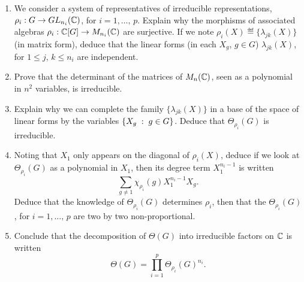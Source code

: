 \begin{exo}
\begin{enumerate}
\item We consider a system of representatives of irreducible representations, $ \rho_i: G \rightarrow GL_{n_i} (\mathbb{C}) $, for $ i = 1, \ldots, \, p $. Explain why the morphisms of associated algebras $ \rho_i: \mathbb{C} [G] \rightarrow M_{n_i} (\mathbb{C}) $ are surjective. If we note $ \rho_i (X) \eqdef \{\lambda_{jk} (X)\} $ (in matrix form), deduce that the linear forms (in each $ X_g $, $ g \in G $) $ \lambda_{jk} (X) $, for $ 1 \leq j, \, k \leq n_i $ are independent.
\item Prove that the determinant of the matrices of $ M_n (\mathbb{C}) $, seen as a polynomial in $ n^2 $ variables, is irreducible.
\item Explain why we can complete the family $ \{\lambda_{jk} (X)\} $ in a base of the space of linear forms by the variables $ \left\{ X_g \;:\; g \in G \right\} $. Deduce that $ \Theta_{\rho_i} (G) $ is irreducible.
\item Noting that $ X_1 $ only appears on the diagonal of $ \rho_i (X) $, deduce if we look at $ \Theta_{\rho_i} (G) $ as a polynomial in $ X_1 $, then its degree term $ X_1^{n_i-1} $ is written
\begin{equation*}
\sum_{g \neq 1}{\chi_{\rho_i} (g) X_1^{n_i-1} X_g}.
\end{equation*}
Deduce that the knowledge of $ \Theta_{\rho_i} (G) $ determines $ \rho_i $, then that the $ \Theta_{\rho_i} (G) $, for $ i = 1, \ldots, \, p $ are two by two non-proportional.
\item Conclude that the decomposition of $ \Theta (G) $ into irreducible factors on $ \mathbb{C} $ is written
\begin{equation*}
\Theta (G) = \prod_{i = 1}^p{\Theta_{\rho_i} (G)^{n_i}}.
\end{equation*}
\end{enumerate}
\end{exo}
 
